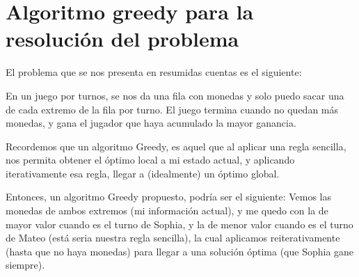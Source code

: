 \section{Algoritmo greedy para la resolución del problema}

El problema que se nos presenta en resumidas cuentas es el siguiente:

En un juego por turnos, se nos da una fila con monedas y solo puedo sacar una de cada extremo de la fila por turno. El juego termina cuando no quedan más monedas, y gana el jugador que haya acumulado la mayor ganancia.

Recordemos que un algoritmo Greedy, es aquel que al aplicar una regla sencilla, nos permita obtener el óptimo local a mi estado actual, y aplicando iterativamente esa regla, llegar a (idealmente) un óptimo global.

Entonces, un algoritmo Greedy propuesto, podría ser el siguiente: Vemos las monedas de ambos extremos (mi información actual), y me quedo con la de mayor valor cuando es el turno de Sophia, y la de menor valor cuando es el turno de Mateo (está seria nuestra regla sencilla), la cual aplicamos reiterativamente (hasta que no haya monedas) para llegar a una solución óptima (que Sophia gane siempre).